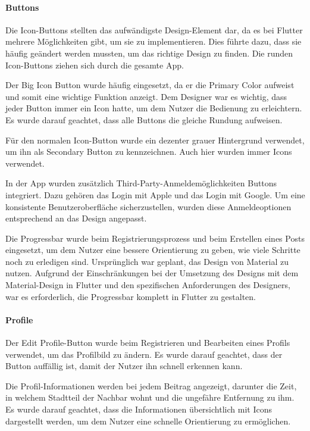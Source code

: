 \paragraph{Buttons}
Die Icon-Buttons stellten das aufwändigste Design-Element
dar, da es bei Flutter mehrere Möglichkeiten gibt, um sie zu
implementieren. Dies führte dazu, dass sie häufig geändert
werden mussten, um das richtige Design zu finden. Die
runden Icon-Buttons ziehen sich durch die gesamte App.

Der Big Icon Button wurde häufig eingesetzt, da er die Primary Color aufweist und somit eine wichtige Funktion anzeigt. Dem Designer war es wichtig, dass jeder Button immer ein Icon hatte, um dem Nutzer die Bedienung zu erleichtern. Es wurde darauf geachtet, dass alle Buttons die gleiche Rundung aufweisen.

Für den normalen Icon-Button wurde ein dezenter grauer Hintergrund verwendet, um ihn als Secondary Button zu kennzeichnen. Auch hier wurden immer Icons verwendet.

In der App wurden zusätzlich Third-Party-Anmeldemöglichkeiten Buttons integriert. Dazu gehören das Login mit Apple und das Login mit Google. Um eine konsistente Benutzeroberfläche sicherzustellen, wurden diese Anmeldeoptionen entsprechend an das Design angepasst.

Die Progressbar wurde beim Registrierungsprozess und beim
Erstellen eines Posts eingesetzt, um dem Nutzer eine bessere
Orientierung zu geben, wie viele Schritte noch zu erledigen
sind. Ursprünglich war geplant, das Design von Material zu
nutzen. Aufgrund der Einschränkungen bei der Umsetzung des
Designs mit dem Material-Design in Flutter und den spezifischen
Anforderungen des Designers, war es erforderlich, die
Progressbar komplett in Flutter zu gestalten.

\paragraph{Profile}

Der Edit Profile-Button wurde beim Registrieren und
Bearbeiten eines Profils verwendet, um das Profilbild
zu ändern. Es wurde darauf geachtet, dass der Button
auffällig ist, damit der Nutzer ihn schnell erkennen kann.

Die Profil-Informationen werden bei jedem Beitrag angezeigt,
darunter die Zeit, in welchem Stadtteil der Nachbar wohnt
und die ungefähre Entfernung zu ihm. Es wurde darauf
geachtet, dass die Informationen übersichtlich mit
Icons dargestellt werden, um dem Nutzer eine schnelle Orientierung
zu ermöglichen.

